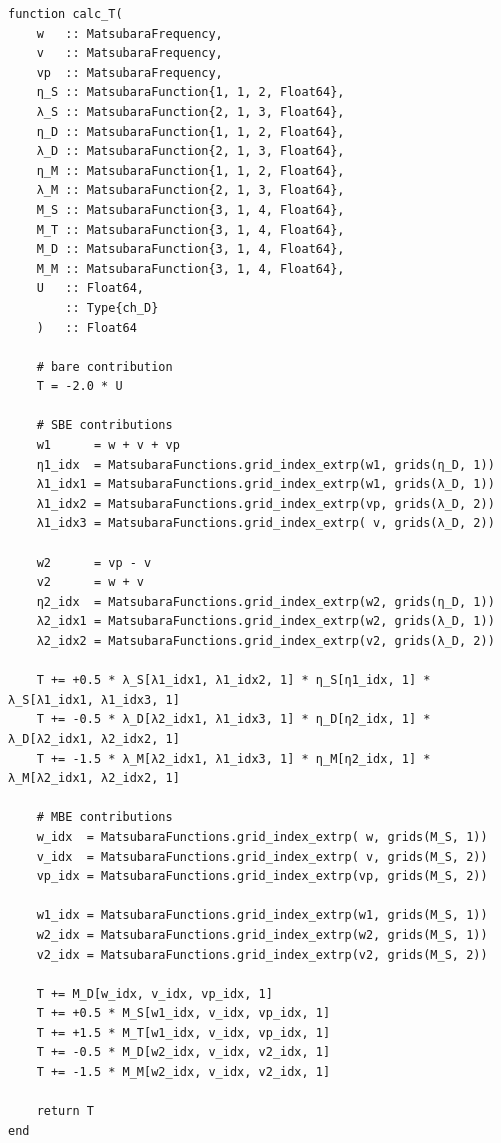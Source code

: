\documentclass{SciPost}
\begin{document}
\begin{verbatim}
function calc_T(
    w   :: MatsubaraFrequency, 
    v   :: MatsubaraFrequency, 
    vp  :: MatsubaraFrequency,
    η_S :: MatsubaraFunction{1, 1, 2, Float64},
    λ_S :: MatsubaraFunction{2, 1, 3, Float64},
    η_D :: MatsubaraFunction{1, 1, 2, Float64},
    λ_D :: MatsubaraFunction{2, 1, 3, Float64},
    η_M :: MatsubaraFunction{1, 1, 2, Float64},
    λ_M :: MatsubaraFunction{2, 1, 3, Float64},
    M_S :: MatsubaraFunction{3, 1, 4, Float64},
    M_T :: MatsubaraFunction{3, 1, 4, Float64},
    M_D :: MatsubaraFunction{3, 1, 4, Float64},
    M_M :: MatsubaraFunction{3, 1, 4, Float64},
    U   :: Float64,
        :: Type{ch_D}
    )   :: Float64

    # bare contribution
    T = -2.0 * U 

    # SBE contributions
    w1      = w + v + vp
    η1_idx  = MatsubaraFunctions.grid_index_extrp(w1, grids(η_D, 1))
    λ1_idx1 = MatsubaraFunctions.grid_index_extrp(w1, grids(λ_D, 1))
    λ1_idx2 = MatsubaraFunctions.grid_index_extrp(vp, grids(λ_D, 2))
    λ1_idx3 = MatsubaraFunctions.grid_index_extrp( v, grids(λ_D, 2))

    w2      = vp - v
    v2      = w + v
    η2_idx  = MatsubaraFunctions.grid_index_extrp(w2, grids(η_D, 1))
    λ2_idx1 = MatsubaraFunctions.grid_index_extrp(w2, grids(λ_D, 1))
    λ2_idx2 = MatsubaraFunctions.grid_index_extrp(v2, grids(λ_D, 2))

    T += +0.5 * λ_S[λ1_idx1, λ1_idx2, 1] * η_S[η1_idx, 1] * λ_S[λ1_idx1, λ1_idx3, 1]
    T += -0.5 * λ_D[λ2_idx1, λ1_idx3, 1] * η_D[η2_idx, 1] * λ_D[λ2_idx1, λ2_idx2, 1]
    T += -1.5 * λ_M[λ2_idx1, λ1_idx3, 1] * η_M[η2_idx, 1] * λ_M[λ2_idx1, λ2_idx2, 1]

    # MBE contributions
    w_idx  = MatsubaraFunctions.grid_index_extrp( w, grids(M_S, 1))
    v_idx  = MatsubaraFunctions.grid_index_extrp( v, grids(M_S, 2))
    vp_idx = MatsubaraFunctions.grid_index_extrp(vp, grids(M_S, 2))

    w1_idx = MatsubaraFunctions.grid_index_extrp(w1, grids(M_S, 1))
    w2_idx = MatsubaraFunctions.grid_index_extrp(w2, grids(M_S, 1))
    v2_idx = MatsubaraFunctions.grid_index_extrp(v2, grids(M_S, 2))

    T += M_D[w_idx, v_idx, vp_idx, 1]
    T += +0.5 * M_S[w1_idx, v_idx, vp_idx, 1]
    T += +1.5 * M_T[w1_idx, v_idx, vp_idx, 1]
    T += -0.5 * M_D[w2_idx, v_idx, v2_idx, 1]
    T += -1.5 * M_M[w2_idx, v_idx, v2_idx, 1]

    return T 
end
\end{verbatim}
\end{document}
